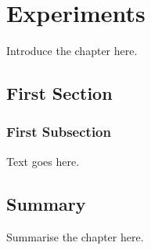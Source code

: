 
\chapter{Experiments}

Introduce the chapter here.

\section{First Section}

\subsection{First Subsection}
Text goes here.

\section{Summary}
Summarise the chapter here.


\newpage
